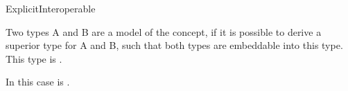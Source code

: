 \begin{ccRefConcept}{ExplicitInteroperable}

\ccDefinition

Two types A and B are a model of the  concept,
if it is possible to derive a superior type for A and B, such that both 
types are embeddable into this type. 
This type is .  

In this case  
is .


\ccSeeAlso
{}\\
\\

\end{ccRefConcept}
